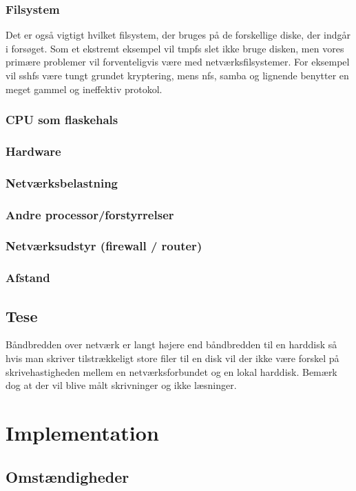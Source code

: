 \documentclass{article}
\begin{document}
\subsubsection{Filsystem}
Det er også vigtigt hvilket filsystem, der bruges på de forskellige diske, der indgår i forsøget. Som et ekstremt eksempel vil tmpfs slet ikke bruge disken, men vores primære problemer vil forventeligvis være med netværksfilsystemer. For eksempel vil sshfs være tungt grundet kryptering, mens nfs, samba og lignende benytter en meget gammel og ineffektiv protokol.

\subsubsection{CPU som flaskehals}
\subsubsection{Hardware}
\subsubsection{Netværksbelastning}
\subsubsection{Andre processor/forstyrrelser}
\subsubsection{Netværksudstyr (firewall / router)}
\subsubsection{Afstand}

\subsection{Tese}
Båndbredden over netværk er langt højere end båndbredden til en harddisk så hvis man skriver tilstrækkeligt store filer til en disk vil der ikke være forskel på skrivehastigheden mellem en netværksforbundet og en lokal harddisk. Bemærk dog at der vil blive målt skrivninger og ikke læsninger.

\section{Implementation}

\subsection{Omstændigheder}
\end{document}

